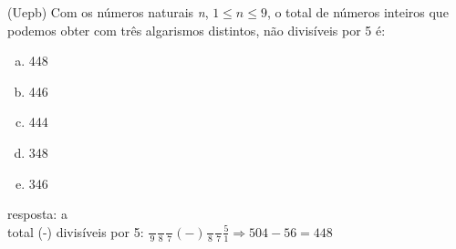 \begin{ex}
(Uepb) Com os números naturais \textit{n}, $ 1\leq n \leq 9 $,  o total de números inteiros que podemos obter com três algarismos distintos, não divisíveis por 5 é:
   \begin{enumerate}[(a)]
   \item 448
   \item 446
   \item 444
   \item 348
   \item 346
   \end{enumerate}
     \begin{sol}
      resposta: a \\
      total (-) divisíveis por 5: \hspace{0,4cm} 
      $\frac{\phantom{A}}{9}\frac{\phantom{A}}{8}\frac{\phantom{A}}{7}(-)\frac{\phantom{A}}{8}\frac{\phantom{A}}{7}\frac{5}{1} \Longrightarrow 504-56=448$
     \end{sol}
\end{ex}